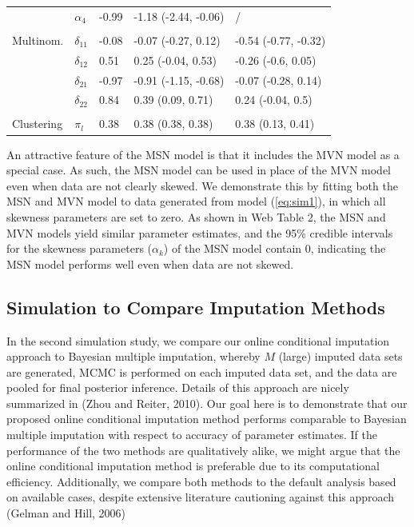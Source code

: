 \documentclass[useAMS,referee]{biom}
\begin{document}
\begin{table}[t]
\begin{tabular}{lllll}
\hspace{1em} & $\alpha_{4}$ & -0.99 & -1.18 (-2.44, -0.06) &     / \\
\addlinespace[0.3em]
\multicolumn{5}{l}{\textbf{ }}\\
\hspace{1em}Multinom. & $\delta_{11}$ & -0.08 & -0.07 (-0.27, 0.12) & -0.54 (-0.77, -0.32)\\
\hspace{1em} & $\delta_{12}$ & 0.51 & 0.25 (-0.04, 0.53) & -0.26 (-0.6, 0.05)\\
\hspace{1em} & $\delta_{21}$ & -0.97 & -0.91 (-1.15, -0.68) & -0.07 (-0.28, 0.14)\\
\hspace{1em} & $\delta_{22}$ & 0.84 & 0.39 (0.09, 0.71) & 0.24 (-0.04, 0.5)\\
\addlinespace[0.3em]
\multicolumn{5}{l}{\textbf{ }}\\
\hspace{1em}Clustering & $\pi_l$ & 0.38 & 0.38 (0.38, 0.38) & 0.38 (0.13, 0.41)\\
\bottomrule
\end{tabular}
\end{table}

An attractive feature of the MSN model is that it includes the MVN model as a special case. As such, the MSN model can be used in place of the MVN model even when data are not clearly skewed. We demonstrate this by fitting both the MSN and MVN model to data generated from model (\ref{eq:sim1}), in which all skewness parameters are set to zero. As shown in Web Table 2, the MSN and MVN models yield similar parameter estimates, and the 95\% credible intervals for the skewness parameters ($\alpha_k$) of the MSN model contain 0, indicating the MSN model performs well even when data are not skewed.

\subsection{Simulation to Compare Imputation Methods}

In the second simulation study, we compare our online conditional imputation approach to Bayesian multiple imputation, whereby $M$ (large) imputed data sets are generated, MCMC is performed on each imputed data set, and the data are pooled for final posterior inference. Details of this approach are nicely summarized in (Zhou and Reiter, 2010). Our goal here is to demonstrate that our proposed online conditional imputation method performs comparable to Bayesian multiple imputation with respect to accuracy of parameter estimates. If the performance of the two methods are qualitatively alike, we might argue that the online conditional imputation method is preferable due to its computational efficiency. Additionally, we compare both methods to the default analysis based on available cases, despite extensive literature cautioning against this approach (Gelman and Hill, 2006)
\end{document}
